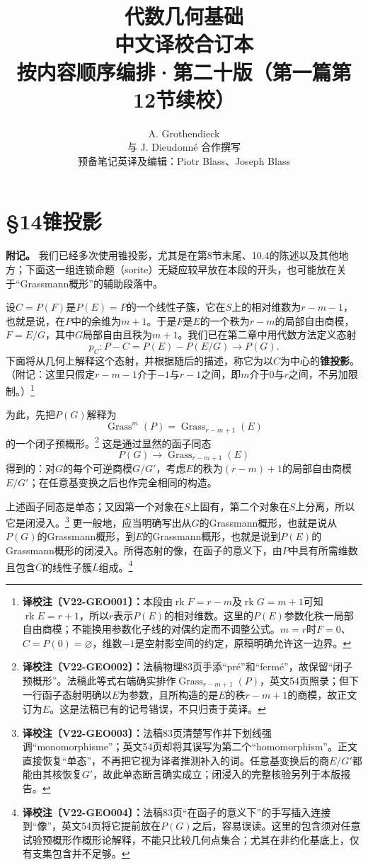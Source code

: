 \documentclass[UTF8,a4paper]{ctexbook}
\title{代数几何基础\\中文译校合订本\\[1em]\large 按内容顺序编排·第二十版（第一篇第12节续校）}
\author{A. Grothendieck\\与 J. Dieudonné 合作撰写\\[.6em]\normalsize 预备笔记英译及编辑：Piotr Blass、Joseph Blass}
\date{}
\newcommand{\cmt}[2]{\footnote{\textbf{译校注〔#1〕：}#2}}
\newcommand{\egasection}[1]{\section*{#1}\addcontentsline{toc}{section}{#1}}
\begin{document}
\mainmatter
\egasection{§14\quad 锥投影}

\noindent\textbf{附记。}
我们已经多次使用锥投影，尤其是在第8节末尾、10.4的陈述以及其他地方；下面这一组连锁命题（sorite）无疑应较早放在本段的开头，也可能放在关于“Grassmann概形”的辅助段落中。

设$C=P(F)$是$P(E)=P$的一个线性子簇，它在$S$上的相对维数为$r-m-1$，也就是说，在$P$中的余维为$m+1$。于是$F$是$E$的一个秩为$r-m$的局部自由商模，$F=E/G$，其中$G$局部自由且秩为$m+1$。我们已在第二章中用代数方法定义态射
\[
p_C:P-C=P(E)-P(E/G)\longrightarrow P(G).
\]
下面将从几何上解释这个态射，并根据随后的描述，称它为以$C$为中心的\textbf{锥投影}。（附记：这里只假定$r-m-1$介于$-1$与$r-1$之间，即$m$介于$0$与$r$之间，不另加限制。）\cmt{V22-GEO001}{本段由$\operatorname{rk}F=r-m$及$\operatorname{rk}G=m+1$可知$\operatorname{rk}E=r+1$，所以$r$表示$P(E)$的相对维数。这里的$P(E)$参数化秩一局部自由商模；不能换用参数化子线的对偶约定而不调整公式。$m=r$时$F=0$、$C=P(0)=\varnothing$，维数$-1$是空射影空间的约定，原稿明确允许这一边界。}

为此，先把$P(G)$解释为
\[
\operatorname{Grass}^{m}(P)
 =\operatorname{Grass}_{r-m+1}(E)
\]
的一个闭子预概形。\cmt{V22-GEO002}{法稿物理83页手添“pré”和“fermé”，故保留“闭子预概形”。法稿此等式右端确实排作$\operatorname{Grass}_{r-m+1}(P)$，英文54页照录；但下一行函子态射明确以$E$为参数，且所构造的是$E$的秩$r-m+1$的商模，故正文订为$E$。这是法稿已有的记号错误，不只归责于英译。}
这是通过显然的函子同态
\[
P(G)\longrightarrow\operatorname{Grass}_{r-m+1}(E)
\]
得到的：对$G$的每个可逆商模$G/G'$，考虑$E$的秩为$(r-m)+1$的局部自由商模$E/G'$；在任意基变换之后也作完全相同的构造。

上述函子同态是单态；又因第一个对象在$S$上固有，第二个对象在$S$上分离，所以它是闭浸入。\cmt{V22-GEO003}{法稿83页清楚写作并下划线强调“monomorphisme”；英文54页却将其误写为第二个“homomorphism”。正文直接恢复“单态”，不再把它视为译者推测补入的词。任意基变换后的商$E/G'$都能由其核恢复$G'$，故此单态断言确实成立；闭浸入的完整核验另列于本版报告。}
更一般地，应当明确写出从$G$的Grassmann概形，也就是说从$P(G)$的Grassmann概形，到$E$的Grassmann概形，也就是说到$P(E)$的Grassmann概形的闭浸入。所得态射的像，在函子的意义下，由$P$中具有所需维数且包含$C$的线性子簇$L$组成。\cmt{V22-GEO004}{法稿83页“在函子的意义下”的手写插入连接到“像”，英文54页将它提前放在$P(G)$之后，容易误读。这里的包含须对任意试验预概形作概形论解释，不能只比较几何点集合；尤其在非约化基底上，仅有支集包含并不足够。}
\end{document}
